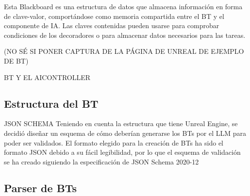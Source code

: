 Esta Blackboard es una estructura de datos que almacena información en forma de clave-valor, comportándose como memoria compartida entre el \gls{BT} y el componente de IA.
Las claves contenidas pueden usarse para comprobar condiciones de los decoradores o para almacenar datos necesarios para las tareas.

(NO SÉ SI PONER CAPTURA DE LA PÁGINA DE UNREAL DE EJEMPLO DE BT)

BT Y EL AICONTROLLER



\subsection{Estructura del \gls{BT}}
JSON SCHEMA
Teniendo en cuenta la estructura que tiene Unreal Engine, se decidió diseñar un esquema de cómo deberían generarse los \glspl{BT} por el \gls{LLM} para poder ser validados.
El formato elegido para la creación de \glspl{BT} ha sido el formato JSON debido a su fácil legibilidad, por lo que el esquema de validación se ha creado siguiendo la especificación de JSON Schema 2020-12


\subsection{Parser de \glspl{BT}}
